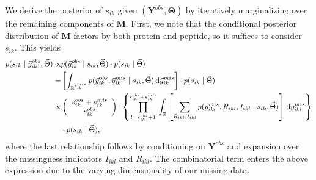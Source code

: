 We derive the posterior of $s_{ik}$ given $(\bm {Y}^{obs}, \bm{\Theta})$ by iteratively marginalizing over the remaining components of $\bm M$.
First, we note that the conditional posterior distribution of $\bm M$ factors by both protein and peptide, so it suffices to consider $s_{ik}$.
This yields
%
\begin{align}
 p( s_{ik} \mid \vec{y}_{ik}^{obs}, \vec{\Theta} ) \propto& p( \vec{y}_{ik}^{obs} \mid s_{ik}, \vec{\Theta} ) \cdot p(s_{ik} \mid \vec{\Theta} ) \\
 =&
\left[ \int_{\mathbb{R}^{s_{ik}^{mis}}} p(\vec{y}_{ik}^{obs}, \vec{y}_{ik}^{mis} \mid s_{ik}, \vec{\Theta}) \, \mathrm{d}\vec{y}_{ik}^{mis} \right] \cdot p(s_{ik} \mid \vec{\Theta}) \\
\nonumber
\propto&
\left(\begin{array}{c}
s_{ik}^{obs}+s_{ik}^{mis}\\
s_{ik}^{obs}
\end{array}\right) \cdot
\left\{ 
\prod_{l=s_{ik}^{obs}+1}^{s_{ik}^{obs}+s_{ik}^{mis}} \int_{\mathbb{R}}
\left[ \sum_{R_{ikl},I_{ikl}} 
p(y_{ikl}^{mis}, R_{ikl},I_{ikl} \mid s_{ik}, \vec{\Theta}) 
\right]
\, \mathrm{d}y_{ikl}^{mis} 
\right\} \\
&\cdot p(s_{ik} \mid \vec{\Theta}) ,
\end{align}
where the last relationship follows by conditioning on $\bm{Y}^{obs}$ and expansion over the missingness indicators $I_{ikl}$ and $R_{ikl}$.
The combinatorial term enters the above expression due to the varying dimensionality of our missing data.

